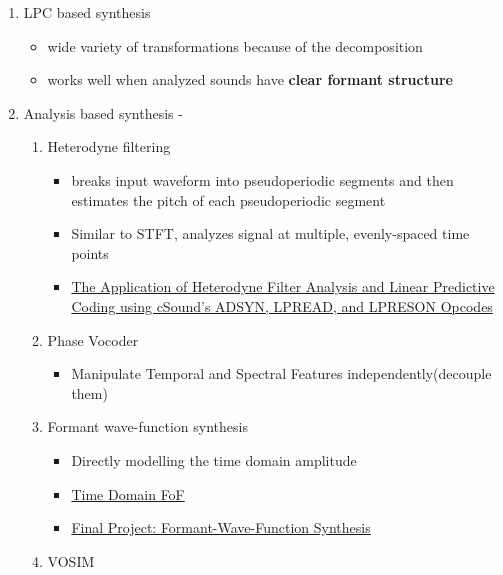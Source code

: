 \documentclass[11pt]{article}
\providecommand{\tightlist}{%
      \setlength{\itemsep}{0pt}\setlength{\parskip}{0pt}}
\begin{document}
\begin{itemize}
  \begin{enumerate}
  \def\labelenumi{\arabic{enumi}.}
  \tightlist
  \item
    LPC based synthesis

    \begin{itemize}
    \tightlist
    \item
      wide variety of transformations because of the decomposition
    \item
      works well when analyzed sounds have \textbf{clear formant
      structure}
    \end{itemize}
  \item
    Analysis based synthesis -

    \begin{enumerate}
    \def\labelenumii{\arabic{enumii}.}
    \tightlist
    \item
      Heterodyne filtering

      \begin{itemize}
      \tightlist
      \item
        breaks input waveform into pseudoperiodic segments and then
        estimates the pitch of each pseudoperiodic segment
      \item
        Similar to STFT, analyzes signal at multiple, evenly-spaced time
        points
      \item
        \href{http://baguyos.tripod.com/DMPST.html}{The Application of
        Heterodyne Filter Analysis and Linear Predictive Coding using
        cSound's ADSYN, LPREAD, and LPRESON Opcodes}
      \end{itemize}
    \item
      Phase Vocoder

      \begin{itemize}
      \tightlist
      \item
        Manipulate Temporal and Spectral Features independently(decouple
        them)
      \end{itemize}
    \item
      Formant wave-function synthesis

      \begin{itemize}
      \tightlist
      \item
        Directly modelling the time domain amplitude
      \item
        \href{https://link.springer.com/chapter/10.1007/978-94-009-9091-3_21}{Time
        Domain FoF}
      \item
        \href{https://ccrma.stanford.edu/~mjolsen/220a/fp.html}{Final
        Project: Formant-Wave-Function Synthesis}
      \end{itemize}
    \item
      VOSIM


\end{enumerate}
\end{enumerate}
\end{itemize}
\end{document}
